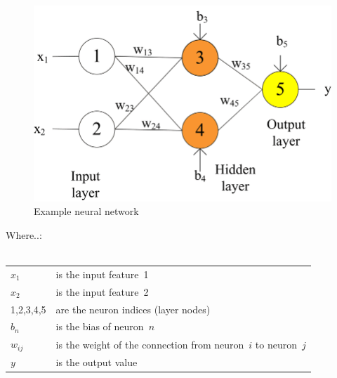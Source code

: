 \documentclass[a4paper,12pt]{report}
\begin{document}
	
\begin{figure}[htbp]
  \centering
  \includegraphics[width=\textwidth]{images/Neural_Network.png}
  \caption{Example neural network}
  \label{fig:fullwidth}
\end{figure}








\noindent
Where..:\\\\
\medskip
\begin{tabular}{@{}l@{\,--\,}l}
  $x_1$       \hspace*{2em} & \hspace*{2em} is the input feature~1 \\
  $x_2$       \hspace*{2em} & \hspace*{2em} is the input feature~2 \\
  1,2,3,4,5   \hspace*{2em} & \hspace*{2em} are the neuron indices (layer nodes) \\
  $b_n$       \hspace*{2em} & \hspace*{2em} is the bias of neuron~$n$ \\
  $w_{ij}$    \hspace*{2em} & \hspace*{2em} is the weight of the connection from neuron~$i$ to neuron~$j$ \\
  $y$         \hspace*{2em} & \hspace*{2em} is the output value
\end{tabular}\\
\end{document}
